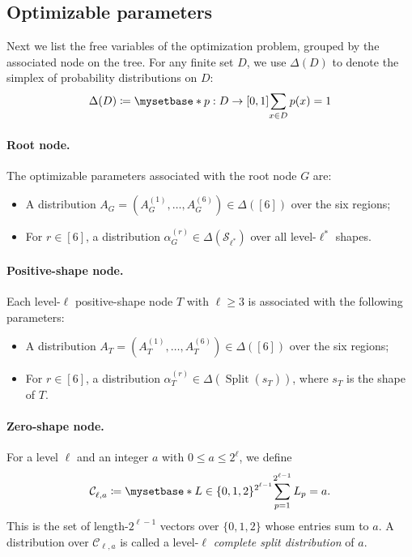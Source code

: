\documentclass[11pt, a4paper, copyright, gdm]{google}
\theoremstyle{definition}
\theoremstyle{remark}
\theoremstyle{plain}
\DeclareMathOperator{\Split}{Split}
\newcommand{\defn}[1]{{\emph{{#1}}}}
\newcommand{\Shapes}{\mathcal{S}}
\newcommand{\defeq}{\coloneqq}
\begin{document}
\subsection{Optimizable parameters}
\label{subsec:optimizable-parameters}
Next we list the free variables of the optimization problem, grouped by the associated node on the tree. For any finite set $D$, we use $\Delta(D)$ to denote the simplex of probability distributions on $D$:
\[
\Delta(D) \defeq \myset*{p: D \rightarrow [0,1]}{\sum_{x\in D} p(x) = 1}
\]

\paragraph{Root node.}
The optimizable parameters associated with the root node $G$ are:
\begin{itemize}
  \item A distribution $A_G^{} = (A_G^{(1)}, \dots, A_G^{(6)}) \in \Delta([6])$ over the six regions;
  \item For $r \in [6]$, a distribution $\alpha_G^{(r)} \in \Delta(\Shapes_{\ell^*}^{})$ over all level-$\ell^*$ shapes.
\end{itemize}

\paragraph{Positive-shape node.}
Each level-$\ell$ positive-shape node $T$ with $\ell \ge 3$ is associated with the following parameters:
\begin{itemize}
  \item A distribution $A_T^{}=(A_T^{(1)},\ldots,A_T^{(6)}) \in \Delta([6])$ over the six regions;
  \item For $r \in [6]$, a distribution $\alpha_T^{(r)}\in\Delta(\Split(s_T^{}))$, where $s_T^{}$ is the shape of $T$.
\end{itemize}

\paragraph{Zero-shape node.}
For a level $\ell$ and an integer $a$ with $0 \le a \le 2^\ell$, we define
\[
  \mathcal C_{\ell,a}^{}
  \coloneqq
  \myset*{L\in\{0,1,2\}^{2^{\ell-1}}}{\sum_{p=1}^{2^{\ell-1}} L_p=a}.
\]
This is the set of length-$2^{\ell-1}$ vectors over $\{0,1,2\}$ whose entries sum to $a$.  A distribution over $\mathcal C_{\ell, a}^{}$ is called a level-$\ell$ \defn{complete split distribution} of $a$.
\end{document}
